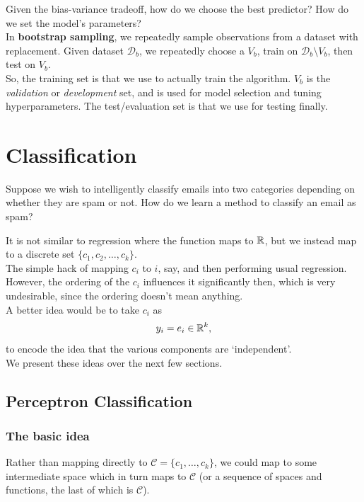 \documentclass{article}
\begin{document}
			Given the bias-variance tradeoff, how do we choose the best predictor? How do we set the model's parameters?\\
			In \textbf{bootstrap sampling}, we repeatedly sample observations from a dataset with replacement. Given dataset $\mathcal{D}_b$, we repeatedly choose a $V_b$, train on $\mathcal{D}_b \setminus V_b$, then test on $V_b$.\\
			So, the training set is that we use to actually train the algorithm. $V_b$ is the \emph{validation} or \emph{development} set, and is used for model selection and tuning hyperparameters. The test/evaluation set is that we use for testing finally.

\section{Classification}

	Suppose we wish to intelligently classify emails into two categories depending on whether they are spam or not. How do we learn a method to classify an email as spam?

	It is not similar to regression where the function maps to $\mathbb{R}$, but we instead map to a discrete set $\{c_1,c_2,\ldots,c_k\}$.\\
	The simple hack of mapping $c_i$ to $i$, say, and then performing usual regression. However, the ordering of the $c_i$ influences it significantly then, which is very undesirable, since the ordering doesn't mean anything.\\
	A better idea would be to take $c_i$ as
	\[ y_i = e_i \in \mathbb{R}^k, \]
	to encode the idea that the various components are `independent'.\\
	We present these ideas over the next few sections.

	\subsection{Perceptron Classification}

		\subsubsection{The basic idea}

			Rather than mapping directly to $\mathcal{C} = \{c_1,\ldots,c_k\}$, we could map to some intermediate space which in turn maps to $\mathcal{C}$ (or a sequence of spaces and functions, the last of which is $\mathcal{C}$).\\
\end{document}
